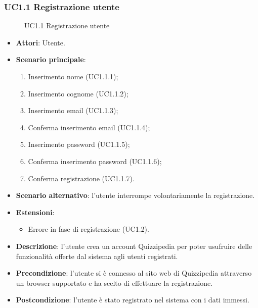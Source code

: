 \subsubsection{UC1.1 Registrazione utente}
\begin{figure}[H]
\centering
\noindent{}
\caption{UC1.1 Registrazione utente}
\end{figure}
\begin{itemize}
\item \textbf{Attori}: Utente.
\item \textbf{Scenario principale}:
\begin{enumerate}
\item Inserimento nome (UC1.1.1);
\item Inserimento cognome (UC1.1.2);
\item Inserimento email (UC1.1.3);
\item Conferma inserimento email (UC1.1.4);
\item Inserimento password (UC1.1.5);
\item Conferma inserimento password (UC1.1.6);
\item Conferma registrazione (UC1.1.7).
\end{enumerate}
\item \textbf{Scenario alternativo}: l'utente interrompe volontariamente la registrazione.
\item \textbf{Estensioni}:
\begin{itemize}
\item Errore in fase di registrazione (UC1.2).
\end{itemize}
\item \textbf{Descrizione}: l'utente crea un account Quizzipedia per poter usufruire delle funzionalità offerte dal sistema agli utenti registrati.
\item \textbf{Precondizione}: l'utente si è connesso al sito web di Quizzipedia attraverso un browser supportato e ha scelto di effettuare la registrazione.
\item \textbf{Postcondizione}: l'utente è stato registrato nel sistema con i dati immessi.
\end{itemize}
